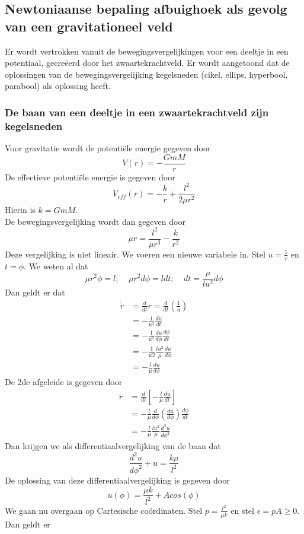 \subsection{Newtoniaanse bepaling afbuighoek als gevolg van een gravitationeel veld}
Er wordt vertrokken vanuit de bewegingsvergelijkingen voor een deeltje in een potentiaal, gecreëerd door het zwaartekrachtveld. Er wordt aangetoond dat de oplossingen van de bewegingsvergelijking kegelsneden (cikel, ellips, hyperbool, parabool) als oplossing heeft.
\subsubsection{De baan van een deeltje in een zwaartekrachtveld zijn kegelsneden}
Voor gravitatie wordt de potentiële energie gegeven door
$$V(r)=-\frac{GmM}{r}$$
De effectieve potentiële energie is gegeven door
$$V_{eff}(r)=-\frac{k}{r}+\frac{l^{2}}{2\mu r^{2}}$$
Hierin is $k=GmM$.\\
De bewegingsvergelijking wordt dan gegeven door
$$\mu\ddot{r}=\frac{l^{2}}{\mu r^{3}}-\frac{k}{r^{2}}$$
Deze vergelijking is niet lineair. We voeren een nieuwe variabele in. Stel $u=\frac{1}{r}$ en $t=\phi$. We weten al dat
$$\mu r^{2}\dot{\phi}=l;\ \ \ \ \ \mu r^{2}d\phi=ldt;\ \ \ \ \ dt=\frac{\mu}{lu^{2}}d\phi$$
Dan geldt er dat
\begin{align}
\dot{r}&=\frac{d}{dt}r=\frac{d}{dt}(\frac{1}{u}) \nonumber \\
&=-\frac{1}{u^{2}}\frac{du}{dt} \nonumber \\
&=-\frac{1}{u^{2}}\frac{du}{d\phi}\frac{d\phi}{dt} \nonumber \\
&=-\frac{1}{u{2}}\frac{lu^{2}}{\mu}\frac{du}{d\phi} \nonumber \\
&=-\frac{l}{\mu}\frac{du}{d\phi} \nonumber 
\end{align}
De 2de afgeleide is gegeven door
\begin{align}
\ddot{r}&=\frac{d}{dt}[-\frac{l}{\mu}\frac{du}{dt}] \nonumber \\
&=-\frac{l}{\mu}\frac{d}{d\phi}(\frac{du}{d\phi})\frac{d\phi}{dt} \nonumber \\
&=-\frac{l}{\mu}\frac{lu^{2}}{\mu}\frac{d^{2}u}{d\phi^{2}} \nonumber 
\end{align}
Dan krijgen we als differentiaalvergelijking van de baan dat
$$\frac{d^{2}u}{d\phi^{2}}+u=\frac{k\mu}{l^{2}}$$
De oplossing van deze differentiaalvergelijking is gegeven door
$$u(\phi)=\frac{\mu k}{l^{2}}+Acos(\phi)$$
We gaan nu overgaan op Cartesische coördinaten. Stel $p=\frac{l^{2}}{\mu k}$ en stel $\epsilon=pA\geq0$. Dan geldt er
